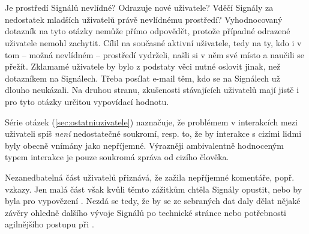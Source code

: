 \section{}

Je prostředí Signálů nevlídné? Odrazuje nové uživatele?
Vděčí Signály za nedostatek mladších uživatelů právě nevlídnému prostředí?
Vyhodnocovaný dotazník na tyto otázky nemůže přímo odpovědět,
protože případné odrazené uživatele nemohl zachytit. Cílil
na současné aktivní uživatele, tedy na ty, kdo i v tom -- možná
nevlídném -- prostředí vydrželi, našli si v něm své místo
a naučili se přežít. Zklamamé uživatele by bylo z podstaty věci
nutné oslovit jinak, než dotazníkem na Signálech. Třeba posílat
e-mail těm, kdo se na Signálech už dlouho neukázali.
Na druhou stranu, zkušenosti stávajících uživatelů
mají jistě i pro tyto otázky určitou vypovídací hodnotu.

Série otázek  (\ref{sec:ostatniuzivatele})
naznačuje, že problémem v interakcích mezi uživateli
spíš \emph{není} nedostatečné soukromí, resp. to, že by interakce
s cizími lidmi byly obecně vnímány jako nepříjemné.
Výrazněji ambivalentně hodnoceným typem interakce je pouze
soukromá zpráva od cizího člověka.

Nezanedbatelná část uživatelů přiznává, že zažila nepříjemné
komentáře, popř. vzkazy. Jen malá část však kvůli těmto
zážitkům chtěla Signály opustit, nebo by byla pro vypovězení
. Nezdá se tedy, že by se ze sebraných dat
daly dělat nějaké závěry ohledně dalšího vývoje Signálů po technické
stránce nebo potřebnosti agilnějšího postupu při .
